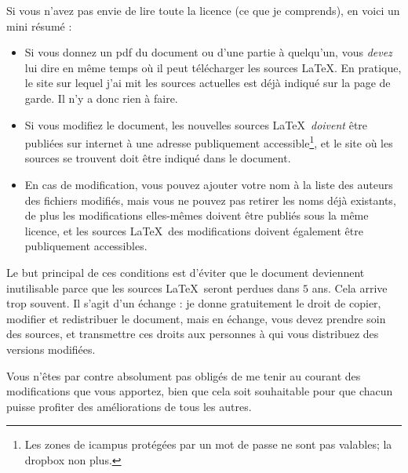 \vspace{1cm}

Si vous n'avez pas envie de lire toute la licence (ce que je comprends), en voici un mini résumé :
\begin{itemize}
	\item 
		Si vous donnez un pdf du document ou d'une partie à quelqu'un, vous \emph{devez} lui dire en même temps où il peut télécharger les sources \LaTeX. En pratique, le site sur lequel j'ai mit les sources actuelles est déjà indiqué sur la page de garde. Il n'y a donc rien à faire.
	\item
		Si vous modifiez le document, les nouvelles sources \LaTeX\ \emph{doivent} être publiées sur internet à une adresse publiquement accessible\footnote{Les zones de icampus protégées par un mot de passe ne sont pas valables; la dropbox non plus.}, et le site où les sources se trouvent doit être indiqué dans le document.
	\item
		En cas de modification, vous pouvez ajouter votre nom à la liste des auteurs des fichiers modifiés, mais vous ne pouvez pas retirer les noms déjà existants, de plus les modifications elles-mêmes doivent être publiés sous la même licence, et les sources \LaTeX\ des modifications doivent également être publiquement accessibles.
\end{itemize}

\vspace{1cm}

Le but principal de ces conditions est d'éviter que le document deviennent inutilisable parce que les sources \LaTeX\ seront perdues dans $5$ ans. Cela arrive trop souvent. Il s'agit d'un échange : je donne gratuitement le droit de copier, modifier et redistribuer le document, mais en échange, vous devez prendre soin des sources, et transmettre ces droits aux personnes à qui vous distribuez des versions modifiées.

Vous n'êtes par contre absolument pas obligés de me tenir au courant des modifications que vous apportez, bien que cela soit souhaitable pour que chacun puisse profiter des améliorations de tous les autres.
